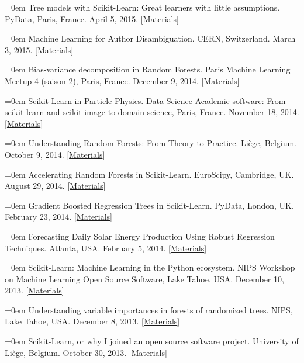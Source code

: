 \documentclass{scrartcl}
\newcommand{\MarginText}[1]{\marginpar{\raggedleft\itshape\small#1}}
\newcommand{\NewPublication}[4]{\noindent\hangindent=0em\hangafter=0 \MarginText{\color{black} #1}{\footnotesize [{\color{Maroon}#2}]} #3 {\footnotesize\color{gray}#4}\vspace{0.5em}}
\begin{document}
\begin{cv}{}
\NewPublication{}{14}{Tree models with Scikit-Learn: Great learners with little assumptions.}{%
PyData, Paris, France.
April 5, 2015.
[\href{https://github.com/glouppe/talk-pydata2015}{Materials}]}

\NewPublication{}{13}{Machine Learning for Author Disambiguation.}{%
CERN, Switzerland.
March 3, 2015.
[\href{https://github.com/glouppe/talk-disambiguation-inspire}{Materials}]}

\NewPublication{2014}{12}{Bias-variance decomposition in Random Forests.}{%
Paris Machine Learning Meetup 4 (saison 2), Paris, France.
December 9, 2014.
[\href{http://hdl.handle.net/2268/174897}{Materials}]}

\NewPublication{}{11}{Scikit-Learn in Particle Physics.}{%
Data Science Academic software: From scikit-learn and scikit-image to domain science, Paris, France.
November 18, 2014.
[\href{https://github.com/glouppe/talk-cds2014}{Materials}]}

\NewPublication{}{10}{Understanding Random Forests: From Theory to Practice.}{%
Li{\`e}ge, Belgium.
October 9, 2014.
[\href{https://github.com/glouppe/phd-thesis}{Materials}]}

\NewPublication{}{9}{Accelerating Random Forests in Scikit-Learn.}{%
EuroScipy, Cambridge, UK.
August 29, 2014.
[\href{https://github.com/glouppe/talk-euroscipy2014}{Materials}]}

\NewPublication{}{8}{Gradient Boosted Regression Trees in Scikit-Learn.}{%
PyData, London, UK.
February 23, 2014.
[\href{https://github.com/glouppe/tutorial-pydata2014}{Materials}]}

\NewPublication{}{7}{Forecasting Daily Solar Energy Production Using Robust Regression Techniques.}{%
Atlanta, USA.
February 5, 2014.
[\href{http://hdl.handle.net/2268/162797}{Materials}]}

\NewPublication{2013}{6}{Scikit-Learn: Machine Learning in the Python ecosystem.}{%
NIPS Workshop on Machine Learning Open Source Software,
Lake Tahoe, USA.
December 10, 2013.
[\href{http://hdl.handle.net/2268/157487}{Materials}]}

\NewPublication{}{5}{Understanding variable importances in forests of randomized trees.}{%
NIPS,
Lake Tahoe, USA.
December 8, 2013.
[\href{http://hdl.handle.net/2268/155642}{Materials}]}

\NewPublication{}{4}{Scikit-Learn, or why I joined an open source software project.}{%
University of Li{\`e}ge, Belgium.
October 30, 2013.
[\href{http://www.slideshare.net/glouppe/scikitlearn-or-why-i-joined-an-open-source-software-project}{Materials}]}


\end{cv}
\end{document}
